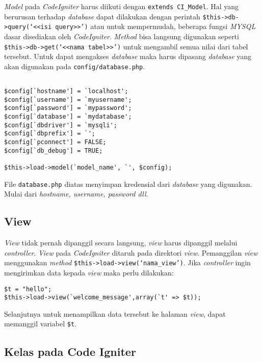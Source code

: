 \textit{Model} pada \textit{CodeIgniter} harus diikuti dengan \texttt{extends CI\_Model}. Hal yang berurusan terhadap \textit{database} dapat dilakukan dengan perintah \texttt{\$this->db->query(\lq<<isi query>>\rq)} atau untuk mempermudah, beberapa fungsi \textit{MYSQL} dasar disediakan oleh \textit{CodeIgniter}.\textit{ Method} bisa langsung digunakan seperti \texttt{\$this->db->get(\lq<<nama tabel>>\rq)}
untuk mengambil semua nilai dari tabel tersebut. Untuk dapat mengakses \textit{database} maka harus dipasang \textit{database} yang akan digunakan pada \texttt{config/database.php}.

\begin{lstlisting}
		
$config[`hostname'] = `localhost';
$config[`username'] = `myusername';
$config[`password'] = `mypassword';
$config[`database'] = `mydatabase';
$config[`dbdriver'] = `mysqli';
$config[`dbprefix'] = `';
$config[`pconnect'] = FALSE;
$config[`db_debug'] = TRUE;

$this->load->model(`model_name', `', $config);
\end{lstlisting}

File \texttt{database.php} diatas menyimpan kredensial dari \textit{database} yang digunakan. Mulai dari \textit{hostname, username, password dll}.

\subsection{View}


\textit{View} tidak pernah dipanggil secara langsung, \textit{view} harus dipanggil melalui \textit{controller}\cite{codeigniter3}.
\textit{View} pada \textit{CodeIgniter} ditaruh pada direktori \textit{view}. Pemanggilan \textit{view} menggunakan \textit{method} \texttt{\$this->load->view(`nama\_view')}. Jika \textit{controller} ingin mengirimkan data kepada \textit{view} maka perlu dilakukan: 

\begin{lstlisting}
$t = "hello";
$this->load->view(`welcome_message',array(`t' => $t));
\end{lstlisting}

Selanjutnya untuk menampilkan data tersebut ke halaman \textit{view}, dapat memanggil variabel \texttt{\$t}.


\subsection{Kelas pada Code Igniter}
